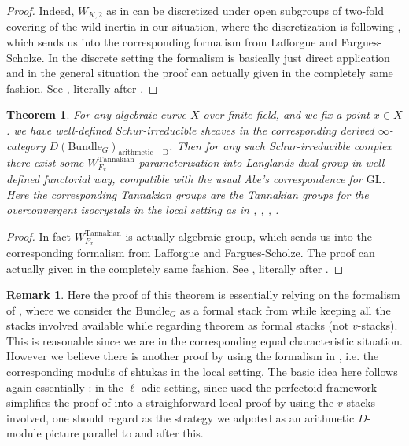 \documentclass[12pt]{book}
\newtheorem{theorem}{Theorem}
\theoremstyle{definition}
\newtheorem{remark}{Remark}
\begin{document}
\begin{proof}
Indeed, $W_{K,2}$ as in \cite{FS} can be discretized under open subgroups of two-fold covering of the wild inertia in our situation, where the discretization is following \cite{FS}, which sends us into the corresponding formalism from Lafforgue and Fargues-Scholze. In the discrete setting the formalism is basically just direct application and in the general situation the proof can actually given in the completely same fashion. See \cite[Chapter VIII Theorem 4.1 and Chapter IX Proposition 4.1]{FS}, literally after \cite{VLa}.
\end{proof}

\begin{theorem}
For any algebraic curve $X$ over finite field, and we fix a point $x\in X$. we have well-defined Schur-irreducible sheaves in the corresponding derived $\infty$-category $D(\mathrm{Bundle}_{G})_{\mathrm{arithmetic-D}}$. Then for any such Schur-irreducible complex there exist some $W^\mathrm{Tannakian}_{F_x}$-parameterization into Langlands dual group in well-defined functorial way, compatible with the usual Abe's correspondence for $\mathrm{GL}$. Here the corresponding Tannakian groups are the Tannakian groups for the overconvergent isocrystals in the local setting as in \cite{AI}, \cite{KI}, \cite{KXII}, \cite{DK}.
\end{theorem}


\begin{proof}
In fact $W^\mathrm{Tannakian}_{F_x}$ is actually algebraic group, which sends us into the corresponding formalism from Lafforgue and Fargues-Scholze. The proof can actually given in the completely same fashion. See \cite[Chapter VIII Theorem 4.1 and Chapter IX Proposition 4.1]{FS}, literally after \cite{VLa}.
\end{proof}

\begin{remark}
Here the proof of this theorem is essentially relying on the formalism of \cite{FS}, where we consider the $\mathrm{Bundle}_G$ as a formal stack from \cite{FS} while keeping all the stacks involved available while regarding theorem as formal stacks (not $v$-stacks). This is reasonable since we are in the corresponding equal characteristic situation. However we believe there is another proof by using the formalism in \cite{GL}, i.e. the corresponding modulis of shtukas in the local setting. The basic idea here follows again essentially \cite{FS}: in the $\ell$-adic setting, since \cite{FS} used the perfectoid framework simplifies the proof of \cite{GL} into a straighforward local proof by using the $v$-stacks involved, one should regard as the strategy we adpoted as an arithmetic $D$-module picture parallel to and after this.
\end{remark}
\end{document}
